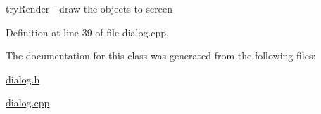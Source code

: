 try\+Render -\/ draw the objects to screen 



Definition at line 39 of file dialog.\+cpp.



The documentation for this class was generated from the following files\+:\begin{DoxyCompactItemize}
\item 
\mbox{\hyperlink{dialog_8h}{dialog.\+h}}\item 
\mbox{\hyperlink{dialog_8cpp}{dialog.\+cpp}}\end{DoxyCompactItemize}
